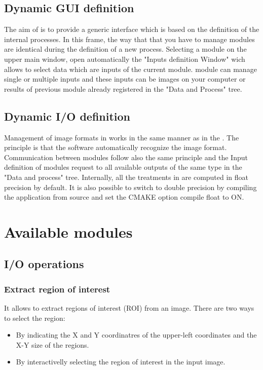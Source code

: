 
\subsection{Dynamic GUI definition}
The aim of \mont is to provide a generic interface which is based on
the definition of the internal processes.  In this frame, the way that
that you have to manage modules are identical during the definition of
a new process.  Selecting a module on the upper main window, open
automatically the "Inputs definition Window" wich allows to select
data which are inputs of the current module. \mont module can manage
single or multiple inputs and these inputs can be images on your
computer or results of previous module already registered in the "Data
and Process" tree.
    
\subsection{Dynamic I/O definition}
Management of image formats in \mont works in the same manner as in
the \otb.  The principle is that the software automatically recognize
the image format.  Communication between modules follow also the same
principle and the Input definition of modules request to all available
outputs of the same type in the "Data and process" tree.  Internally,
all the treatments in \mont are computed in float precision by
default. It is also possible to switch to double precision by
compiling the application from source and set the CMAKE option compile
float to ON.

\section{Available modules}\label{sec:modules} 
\subsection{I/O operations}
\subsubsection{Extract region of interest}
It allows to extract regions of interest (ROI) from an image. There
are two ways to select the region:
\begin{itemize}
\item By indicating the X and Y coordinatres of the upper-left
  coordinates and the X-Y size of the regions.
\item By interactivelly selecting the region of interest in the input image.
\end{itemize}


